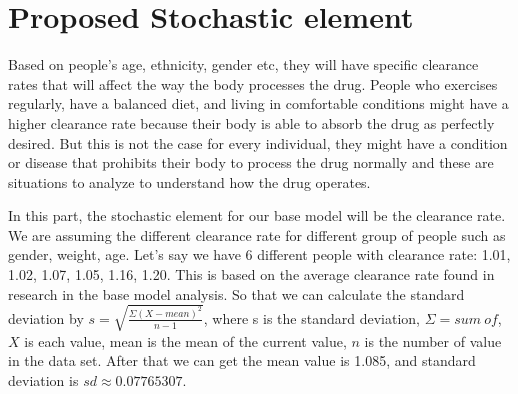 \documentclass{article}
\begin{document}
\section*{Proposed Stochastic element}
Based on people's age, ethnicity, gender etc, they will have specific clearance rates that will affect the way the body processes the drug. People who exercises regularly, have a balanced diet, and living in comfortable conditions might have a higher clearance rate because their body is able to absorb the drug as perfectly desired. But this is not the case for every individual, they might have a condition or disease that prohibits their body to process the drug normally and these are situations to analyze to understand how the drug operates. 

In this part, the stochastic element for our base model will be the clearance rate. We are assuming the different clearance rate for different group of people such as gender, weight, age. Let's say we have 6 different people with clearance rate: 1.01, 1.02, 1.07, 1.05, 1.16, 1.20. This is based on the average clearance rate found in research in the base model analysis. So that we can calculate the standard deviation by $s = \sqrt{\frac{\Sigma (X-mean)^{2}}{n-1}}$, where s is the standard deviation, $\Sigma = sum \ of$, $X$ is each value, mean is the mean of the current value, $n$ is the number of value in the data set. After that we can get the mean value is 1.085, and standard deviation is $sd \approx 0.07765307$.\\
\end{document}

